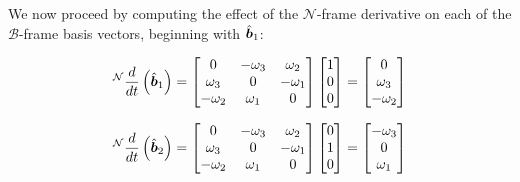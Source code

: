 We now proceed by computing the effect of the $\mathcal{N}$-frame derivative on each of the $\mathcal{B}$-frame basis vectors, beginning with $\hat{\boldsymbol{b}}_1$:

\begin{align*}
    {}^\mathcal{N}\frac{d}{dt}\left(\hat{\boldsymbol{b}}_1\right) &= \begin{bmatrix}
            0 & -\omega_3 & \omega_2 \\
            \omega_3 & 0 & -\omega_1 \\
            -\omega_2 & \omega_1 & 0 \\
        \end{bmatrix}
        \begin{bmatrix}
            1 \\ 0 \\ 0
        \end{bmatrix} = \begin{bmatrix}
            0 \\ \omega_3 \\ -\omega_2
        \end{bmatrix} \\
\end{align*}

\begin{align*}
    {}^\mathcal{N}\frac{d}{dt}\left(\hat{\boldsymbol{b}}_2\right) &= \begin{bmatrix}
            0 & -\omega_3 & \omega_2 \\
            \omega_3 & 0 & -\omega_1 \\
            -\omega_2 & \omega_1 & 0 \\
        \end{bmatrix}
        \begin{bmatrix}
            0 \\ 1 \\ 0
        \end{bmatrix} = \begin{bmatrix}
            -\omega_3 \\ 0 \\ \omega_1
        \end{bmatrix} \\
\end{align*}

